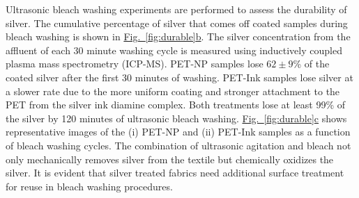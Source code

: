 \documentclass[journal=jacsat,manuscript=article]{achemso}
\newcommand{\figref}[2][]{\hyperref[#2]{Fig.~\ref{#2}#1}}
\begin{document}
Ultrasonic bleach washing experiments are performed to assess the durability of silver.  
The cumulative percentage of silver that comes off coated samples during bleach washing is shown in 
\figref[b]{fig:durable}. The silver concentration from the affluent of each 30 minute washing cycle is measured using inductively coupled plasma mass spectrometry (ICP-MS). 
PET-NP samples lose $62 \pm 9$\% of the coated silver after the first 30 minutes of washing. 
PET-Ink samples lose silver at a slower rate due to the more uniform coating and stronger attachment to the PET from the silver ink diamine complex. 
Both treatments lose at least 99\% of the silver by 120 minutes of ultrasonic bleach washing. 
\figref[c]{fig:durable} shows representative images of the (i) PET-NP and (ii) PET-Ink samples as a function of bleach washing cycles.  
The combination of ultrasonic agitation and bleach not only mechanically removes silver from the textile but chemically oxidizes the silver.  
It is evident that silver treated fabrics need additional surface treatment for reuse in bleach washing procedures. 
\end{document}
